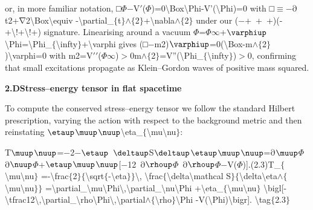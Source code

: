 \documentclass{iopjournal}
\begin{document}
or, in more familiar notation, □$\Phi$$\mathrm{-}$V$\mathrm{\prime}$($\Phi$)=0{\textbackslash}Box{\textbackslash}Phi-V'({\textbackslash}Phi)=0 with □$\mathrm{\equiv}$$\mathrm{-}$$\mathrm{\partial}$t2+$\mathrm{\nabla }$2{\textbackslash}Box{\textbackslash}equiv -{\textbackslash}partial\_$\mathrm{\{}$t$\mathrm{\}}$$\mathrm{\wedge}$$\mathrm{\{}$2$\mathrm{\}}$+{\textbackslash}nabla$\mathrm{\wedge}$$\mathrm{\{}$2$\mathrm{\}}$ under our ($\mathrm{-}$+\ $\mathrm{}$+\ $\mathrm{}$+)(-+{\textbackslash}!+{\textbackslash}!+) signature. Linearising around a vacuum $\Phi$=$\Phi$$\mathrm{\infty}$+$\varphiup${\textbackslash}Phi={\textbackslash}Phi\_$\mathrm{\{}${\textbackslash}infty$\mathrm{\}}$+{\textbackslash}varphi gives (□$\mathrm{-}$m2)$\varphiup$=0({\textbackslash}Box-m$\mathrm{\wedge}$$\mathrm{\{}$2$\mathrm{\}}$){\textbackslash}varphi=0 with m2=V$\mathrm{\prime}$$\mathrm{\prime}$($\Phi$$\mathrm{\infty}$)$\mathrm{>}$0m$\mathrm{\wedge}$$\mathrm{\{}$2$\mathrm{\}}$=V''({\textbackslash}Phi\_$\mathrm{\{}${\textbackslash}infty$\mathrm{\}}$)$\mathrm{>}$0, confirming that small excitations propagate as Klein--Gordon waves of positive mass squared.


\textbf{2.D{\qquad}Stress--energy tensor in flat spacetime}

To compute the conserved stress--energy tensor we follow the standard Hilbert prescription, varying the action with respect to the background metric and then reinstating $\etaup$$\muup$$\nuup${\textbackslash}eta\_$\mathrm{\{}${\textbackslash}mu{\textbackslash}nu$\mathrm{\}}$:

T$\muup$$\nuup$=$\mathrm{-}$2$\mathrm{-}$$\etaup$\ $\deltaup$S$\deltaup$$\etaup$$\muup$$\nuup$=$\mathrm{\partial}$$\muup$$\Phi$\ $\mathrm{\partial}$$\nuup$$\Phi$+$\etaup$$\muup$$\nuup$[$\mathrm{-}$12\ $\mathrm{\partial}$$\rhoup$$\Phi$\ $\mathrm{\partial}$$\rhoup$$\Phi$$\mathrm{-}$V($\Phi$)].(2.3)T\_$\mathrm{\{}${\textbackslash}mu{\textbackslash}nu$\mathrm{\}}$ =-{\textbackslash}frac$\mathrm{\{}$2$\mathrm{\}}$$\mathrm{\{}${\textbackslash}sqrt$\mathrm{\{}$-{\textbackslash}eta$\mathrm{\}}$$\mathrm{\}}${\textbackslash}, {\textbackslash}frac$\mathrm{\{}${\textbackslash}delta{\textbackslash}mathcal S$\mathrm{\}}$$\mathrm{\{}${\textbackslash}delta{\textbackslash}eta$\mathrm{\wedge}$$\mathrm{\{}${\textbackslash}mu{\textbackslash}nu$\mathrm{\}}$$\mathrm{\}}$ ={\textbackslash}partial\_{\textbackslash}mu{\textbackslash}Phi{\textbackslash},{\textbackslash}partial\_{\textbackslash}nu{\textbackslash}Phi +{\textbackslash}eta\_$\mathrm{\{}${\textbackslash}mu{\textbackslash}nu$\mathrm{\}}$ {\textbackslash}bigl[-{\textbackslash}tfrac12{\textbackslash},{\textbackslash}partial\_{\textbackslash}rho{\textbackslash}Phi{\textbackslash},{\textbackslash}partial$\mathrm{\wedge}$$\mathrm{\{}${\textbackslash}rho$\mathrm{\}}${\textbackslash}Phi -V({\textbackslash}Phi){\textbackslash}bigr]. {\textbackslash}tag$\mathrm{\{}$2.3$\mathrm{\}}$
\end{document}
